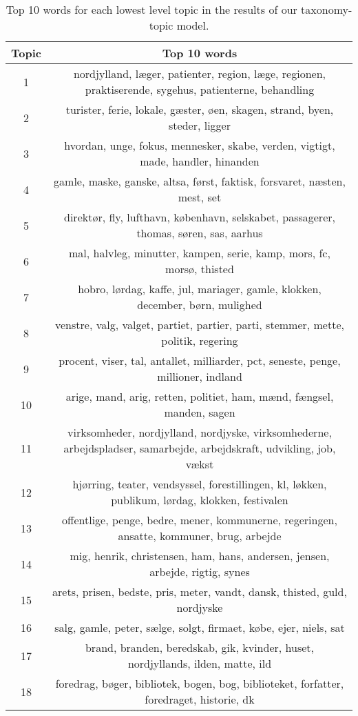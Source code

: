 \begin{longtable}[c]{c | c}
		\caption{Top 10 words for each lowest level topic in the results of our taxonomy-topic model. \label{tab:pachinko_topics}}\\
		Topic & Top 10 words \\
		\hline
		\endfirsthead
		1 & nordjylland, læger, patienter, region, læge, regionen, praktiserende, sygehus, patienterne, behandling \\
		2 & turister, ferie, lokale, gæster, øen, skagen, strand, byen, steder, ligger \\
		3 & hvordan, unge, fokus, mennesker, skabe, verden, vigtigt, made, handler, hinanden \\
		4 & gamle, maske, ganske, altsa, først, faktisk, forsvaret, næsten, mest, set \\
		5 & direktør, fly, lufthavn, københavn, selskabet, passagerer, thomas, søren, sas, aarhus \\
		6 & mal, halvleg, minutter, kampen, serie, kamp, mors, fc, morsø, thisted \\
		7 & hobro, lørdag, kaffe, jul, mariager, gamle, klokken, december, børn, mulighed \\
		8 & venstre, valg, valget, partiet, partier, parti, stemmer, mette, politik, regering \\
		9 & procent, viser, tal, antallet, milliarder, pct, seneste, penge, millioner, indland \\
		10 & arige, mand, arig, retten, politiet, ham, mænd, fængsel, manden, sagen \\
		11 & virksomheder, nordjylland, nordjyske, virksomhederne, arbejdspladser, samarbejde, arbejdskraft, udvikling, job, vækst \\
		12 & hjørring, teater, vendsyssel, forestillingen, kl, løkken, publikum, lørdag, klokken, festivalen \\
		13 & offentlige, penge, bedre, mener, kommunerne, regeringen, ansatte, kommuner, brug, arbejde \\
		14 & mig, henrik, christensen, ham, hans, andersen, jensen, arbejde, rigtig, synes \\
		15 & arets, prisen, bedste, pris, meter, vandt, dansk, thisted, guld, nordjyske \\
		16 & salg, gamle, peter, sælge, solgt, firmaet, købe, ejer, niels, sat \\
		17 & brand, branden, beredskab, gik, kvinder, huset, nordjyllands, ilden, matte, ild \\
		18 & foredrag, bøger, bibliotek, bogen, bog, biblioteket, forfatter, foredraget, historie, dk \\

\end{longtable}
